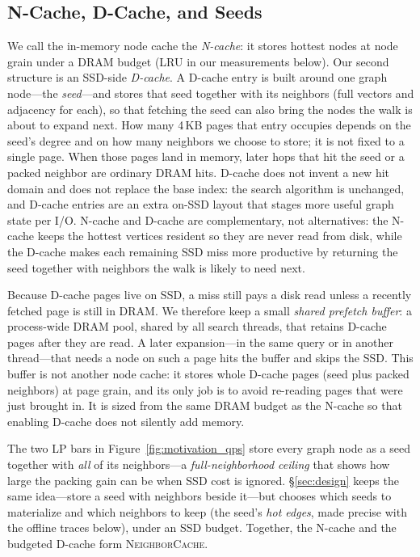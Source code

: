 \subsection{N-Cache, D-Cache, and Seeds}
\label{sec:motivation}
We call the in-memory node cache the \emph{N-cache}: it stores hottest nodes at node grain under a DRAM budget (LRU in our measurements below).
Our second structure is an SSD-side \emph{D-cache}.
A D-cache entry is built around one graph node---the \emph{seed}---and stores that seed together with its neighbors (full vectors and adjacency for each), so that fetching the seed can also bring the nodes the walk is about to expand next.
How many 4\,KB pages that entry occupies depends on the seed's degree and on how many neighbors we choose to store; it is not fixed to a single page.
When those pages land in memory, later hops that hit the seed or a packed neighbor are ordinary DRAM hits.
D-cache does not invent a new hit domain and does not replace the base index: the search algorithm is unchanged, and D-cache entries are an extra on-SSD layout that stages more useful graph state per I/O.
N-cache and D-cache are complementary, not alternatives: the N-cache keeps the hottest vertices resident so they are never read from disk, while the D-cache makes each remaining SSD miss more productive by returning the seed together with neighbors the walk is likely to need next.

Because D-cache pages live on SSD, a miss still pays a disk read unless a recently fetched page is still in DRAM.
We therefore keep a small \emph{shared prefetch buffer}: a process-wide DRAM pool, shared by all search threads, that retains D-cache pages after they are read.
A later expansion---in the same query or in another thread---that needs a node on such a page hits the buffer and skips the SSD.
This buffer is not another node cache: it stores whole D-cache pages (seed plus packed neighbors) at page grain, and its only job is to avoid re-reading pages that were just brought in.
It is sized from the same DRAM budget as the N-cache so that enabling D-cache does not silently add memory.

The two LP bars in Figure~\ref{fig:motivation_qps} store every graph node as a seed together with \emph{all} of its neighbors---a \emph{full-neighborhood ceiling} that shows how large the packing gain can be when SSD cost is ignored.
\S\ref{sec:design} keeps the same idea---store a seed with neighbors beside it---but chooses which seeds to materialize and which neighbors to keep (the seed's \emph{hot edges}, made precise with the offline traces below), under an SSD budget.
Together, the N-cache and the budgeted D-cache form \textsc{NeighborCache}.

